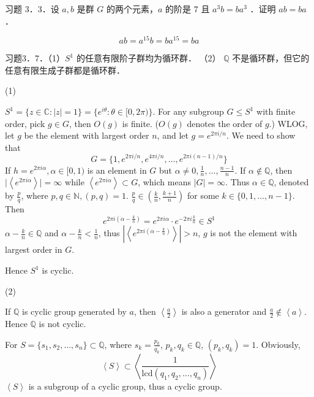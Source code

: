 \begin{exercise}
习题 3．3．设 $a, b$ 是群 $G$ 的两个元素，$a$ 的阶是 7 且 $a^3 b=b a^3$ ．证明 $a b=b a$ ．
\end{exercise}
\[
ab=a^{15}b=b a^{15}=ba
\]
\begin{exercise}
习题3．7．（1）$S^1$ 的任意有限阶子群均为循环群．
（2） $\mathbb{Q}$ 不是循环群，但它的任意有限生成子群都是循环群．
\end{exercise}
(1)

$S^{1}=\{ z\in \mathbb{C} :\lvert z \rvert=1\}=\{ e^{ i\theta }:\theta\in[0,2\pi) \}$. For any subgroup $G\leq S^{1}$ with finite order, pick $g\in G$, then $O(g)$ is finite. ($O(g)$ denotes the order of $g$.) WLOG, let $g$ be the element with largest order $n$, and let $g=e^{ 2\pi i /n }$. We need to show that
\[
G=\{ 1,e^{ 2\pi i/n  },e^{ 4\pi i/n  },\dots,e^{ 2\pi i(n-1)/n } \}
\]
If $h=e^{ 2\pi i\alpha },\alpha\in[0,1)$ is an element in $G$ but $\alpha\neq0,\frac{1 }{n},\dots,\frac{n-1}{n}$. If $\alpha \not\in \mathbb{Q}$, then $\lvert \left< e^{ 2\pi i\alpha } \right> \rvert=\infty$ while $\left< e^{ 2\pi i\alpha } \right>\subset G$, which means $\lvert G \rvert=\infty$. Thus $\alpha\in \mathbb{Q}$, denoted by $\frac{p}{q}$, where $p, q\in \mathbb{N},(p,q)=1$. $\frac{p}{q}\in\left( \frac{k}{n},\frac{k+1}{n} \right)$ for some $k\in \{ 0,1,\dots,n-1 \}$. Then
\[
e^{ 2\pi i \left( \alpha-\frac{k}{n} \right) }=e^{ 2\pi i\alpha  }\cdot e^{ -2\pi i\frac{k}{n} }\in S^{1}
\]
$\alpha-\frac{k}{n}\in \mathbb{Q}$ and $\alpha-\frac{k}{n}<\frac{1}{n}$, thus $\left\lvert  \left< e^{ 2\pi i\left( \alpha-\frac{k}{n} \right) } \right>  \right\rvert>n$, $g$ is not the element with largest order in $G$.

Hence $S^{1}$ is cyclic.

(2)

If  $\mathbb{Q}$ is cyclic group generated by $a$, then $\left< \frac{a}{2} \right>$ is also a generator and $\frac{a}{2}\not\in\left< a \right>$. Hence $\mathbb{Q}$ is not cyclic.

For $S=\{ s_1,s_2,\dots,s_n \}\subset \mathbb{Q}$, where $s_k=\frac{p_k}{q_k}$, $p_k, q_k\in \mathbb{Q}$, $(p_k,q_k)=1$. Obviously,
\[
\left< S \right>\subset\left< \frac{1}{\mathrm{lcd}(q_1,q_2,\dots,q_n)}  \right>
\]
$\left< S \right>$ is a subgroup of a cyclic group, thus a cyclic group.
